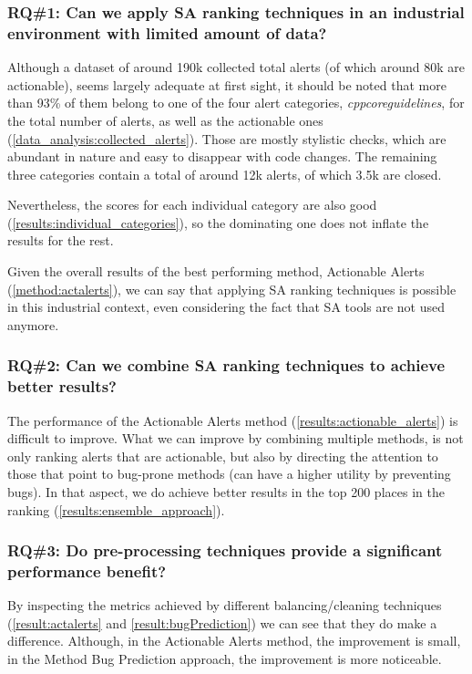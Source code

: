 \subsubsection{RQ\#1: Can we apply SA ranking techniques in an industrial environment with limited amount of data?}

Although a dataset of around 190k collected total alerts (of which around 80k are actionable), seems largely adequate at first sight, it should be noted that more than 93\% of them belong to one of the four alert categories, \textit{cppcoreguidelines}, for the total number of alerts, as well as the actionable ones (\cref{data_analysis:collected_alerts}). Those are mostly stylistic checks, which are abundant in nature and easy to disappear with code changes. The remaining three categories contain a total of around 12k alerts, of which 3.5k are closed.

Nevertheless, the scores for each individual category are also good (\cref{results:individual_categories}), so the dominating one does not inflate the results for the rest.

Given the overall results of the best performing method, Actionable Alerts (\cref{method:actalerts}), we can say that applying SA ranking techniques is possible in this industrial context, even considering the fact that SA tools are not used anymore.

\subsubsection{RQ\#2: Can we combine SA ranking techniques to achieve better results?}

The performance of the Actionable Alerts method (\cref{results:actionable_alerts}) is difficult to improve. What we can improve by combining multiple methods, is not only ranking alerts that are actionable, but also by directing the attention to those that point to bug-prone methods (can have a higher utility by preventing bugs). In that aspect, we do achieve better results in the top 200 places in the ranking (\cref{results:ensemble_approach}).


\subsubsection{RQ\#3: Do pre-processing techniques provide a significant performance benefit?}

By inspecting the metrics achieved by different balancing/cleaning techniques (\cref{result:actalerts} and \cref{result:bugPrediction}) we can see that they do make a difference. Although, in the Actionable Alerts method, the improvement is small, in the Method Bug Prediction approach, the improvement is more noticeable.

